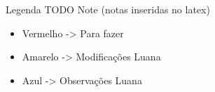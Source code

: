 \documentclass[tc,oneside]{iiufrgs}
\begin{document}
	
	
	
            
	\listoftodos
    \newpage
     Legenda TODO Note (notas inseridas no latex)
	\begin{itemize}
	\item \color{red} Vermelho -> Para fazer
	\color{black}
	\item \color{yellow} Amarelo -> Modificações Luana
	\color{black}
	\item \color{blue} Azul -> Observações Luana
	\end{itemize}	
\end{document}
